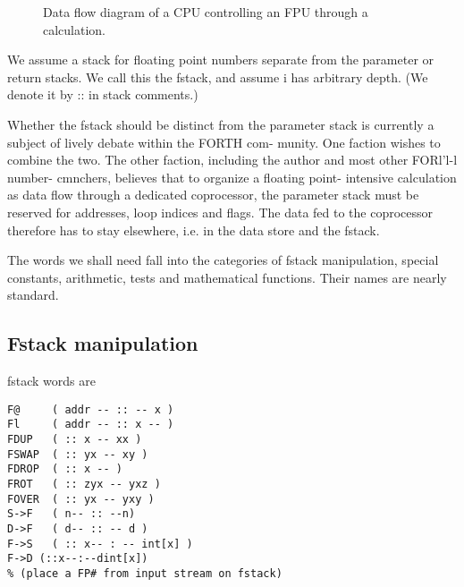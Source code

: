 \begin{figure}
    \caption{Data flow diagram of a CPU controlling an FPU through a calculation.}
    \label{fig:03_01}
\end{figure}

We assume a stack for floating point numbers separate from the 
parameter or return stacks. We call this the fstack, and assume i
has arbitrary depth. (We denote it by :: in stack comments.)

\leftbar[1\linewidth] 
Whether the fstack should be distinct from the parameter stack
is currently a subject of lively debate within the FORTH com-
munity. One faction wishes to combine the two. The other
faction, including the author and most other FORl'l-l number-
cmnchers, believes that to organize a floating point- intensive
calculation as data ﬂow through a dedicated coprocessor, the
parameter stack must be reserved for addresses, loop indices and
ﬂags. The data fed to the coprocessor therefore has to stay
elsewhere, i.e. in the data store and the fstack.
\endleftbar

The words we shall need fall into the categories of fstack 
manipulation, special constants, arithmetic, tests and mathematical functions.
Their names are nearly standard.

\subsection{Fstack manipulation}
 fstack words are
\begin{verbatim}
F@     ( addr -- :: -- x )
Fl     ( addr -- :: x -- )
FDUP   ( :: x -- xx )
FSWAP  ( :: yx -- xy )
FDROP  ( :: x -- )
FROT   ( :: zyx -- yxz )
FOVER  ( :: yx -- yxy )
S->F   ( n-- :: --n)
D->F   ( d-- :: -- d )
F->S   ( :: x-- : -- int[x] )
F->D (::x--:--dint[x])
% (place a FP# from input stream on fstack)
\end{verbatim}
 
